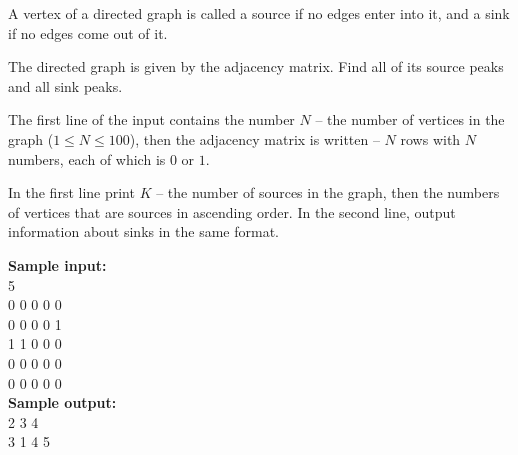 \documentclass[a4paper]{article}
\begin{document}
A vertex of a directed graph is called a source if no edges enter into it, and a sink if no edges come out of it.

The directed graph is given by the adjacency matrix. Find all of its source peaks and all sink peaks.

The first line of the input contains the number $N$ -- the number of vertices in the graph ($1 \le N \le 100$), then the adjacency matrix is written -- $N$ rows with $N$ numbers, each of which is $0$ or $1$.

In the first line print $K$ -- the number of sources in the graph, then the numbers of vertices that are sources in ascending order. In the second line, output information about sinks in the same format.

\LINE

\noindent \textbf{Sample input:}\\
5\\
0 0 0 0 0\\
0 0 0 0 1\\
1 1 0 0 0\\
0 0 0 0 0\\
0 0 0 0 0\\

\noindent \textbf{Sample output:}\\
2 3 4\\
3 1 4 5\\
\end{document}
